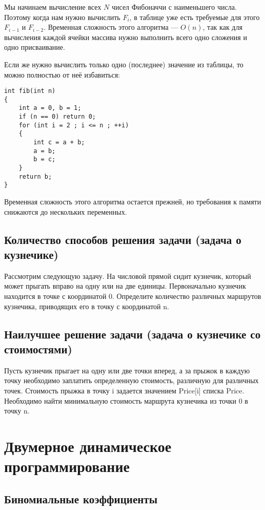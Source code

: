 \documentclass[14pt]{book}
\begin{document}
Мы начинаем вычисление всех $N$ чисел Фибоначчи с наименьшего числа. Поэтому когда нам
нужно вычислить $F_i$, в таблице уже есть требуемые для этого $F_{i-1}$ и $F_{i-2}$.
Временная сложность этого алгоритма --- $O(n)$, так как для вычисления каждой ячейки
массива нужно выполнить всего одно сложения и одно присваивание.

Если же нужно вычислить только одно (последнее) значение из таблицы, то можно полностью
от неё избавиться:

\begin{lstlisting}
int fib(int n)
{
    int a = 0, b = 1;
    if (n == 0) return 0;
    for (int i = 2 ; i <= n ; ++i)
    {
        int c = a + b;
        a = b;
        b = c;
    }
    return b;
}
\end{lstlisting}

Временная сложность этого алгоритма остается прежней, но требования к памяти снижаются
до нескольких переменных.

\subsection{Количество способов решения задачи (задача о кузнечике)}

Рассмотрим следующую задачу. На числовой прямой сидит кузнечик, который может прыгать вправо на одну или на две единицы. Первоначально кузнечик находится в точке с координатой 0. Определите количество различных маршрутов кузнечика, приводящих его в точку с координатой n.

\subsection{Наилучшее решение задачи (задача о кузнечике со стоимостями)}

Пусть кузнечик прыгает на одну или две точки вперед, а за прыжок в каждую точку необходимо заплатить определенную стоимость, различную для различных точек. Стоимость прыжка в точку i задается значением Price[i] списка Price. Необходимо найти минимальную стоимость маршрута кузнечика из точки 0 в точку n.

\section{Двумерное динамическое программирование}

\subsection{Биномиальные коэффициенты}
\end{document}
